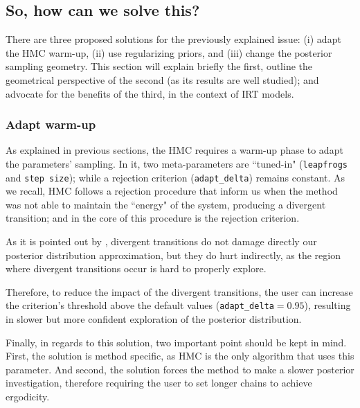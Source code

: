 
\subsection{So, how can we solve this?}

There are three proposed solutions for the previously explained issue: (i) adapt the HMC warm-up, (ii) use regularizing priors, and (iii) change the posterior sampling geometry. This section will explain briefly the first, outline the geometrical perspective of the second (as its results are well studied); and advocate for the benefits of the third, in the context of IRT models.


\subsubsection{Adapt warm-up}

As explained in previous sections, the HMC requires a warm-up phase to adapt the parameters' sampling. In it, two meta-parameters are ``tuned-in" (\texttt{leapfrogs} and \texttt{step size}); while a rejection criterion (\texttt{adapt\_delta}) remains constant. As we recall, HMC follows a rejection procedure that inform us when the method was not able to maintain the ``energy" of the system, producing a divergent transition; and in the core of this procedure is the rejection criterion.

As it is pointed out by \citet{McElreath_2020}, divergent transitions do not damage directly our posterior distribution approximation, but they do hurt indirectly, as the region where divergent transitions occur is hard to properly explore.

Therefore, to reduce the impact of the divergent transitions, the user can increase the criterion's threshold above the default values (\texttt{adapt\_delta}$=0.95$), resulting in slower but more confident exploration of the posterior distribution.

Finally, in regards to this solution, two important point should be kept in mind. First, the solution is method specific, as HMC is the only algorithm that uses this parameter. And second, the solution forces the method to make a slower posterior investigation, therefore requiring the user to set longer chains to achieve ergodicity.

